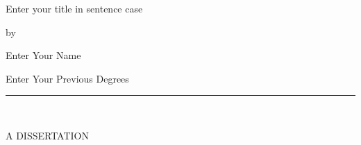 \begin{center}

   \vspace{1cm}


\large Enter your title in sentence case\\

\vspace{0.5cm}

by\\

\vspace{0.5cm}


\large Enter Your Name\\

 \vspace{0.3cm}


   Enter Your Previous Degrees\\

   \vspace{0.35cm}
   \rule{2in}{0.5pt}\\
   \vspace{0.65cm}

   {\large A DISSERTATION}\\


\end{center}
